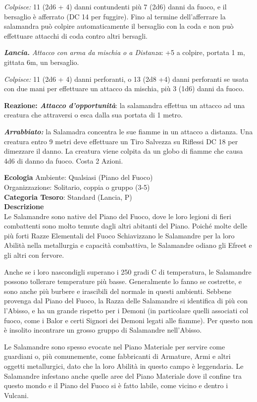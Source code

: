 \begin{multicols}{2}
{\emph{Colpisce:} 11 (2d6 + 4) danni contundenti più 7 (2d6) danni da fuoco, e il bersaglio è afferrato (DC 14 per fuggire). Fino al termine dell'afferrare la salamandra può colpire automaticamente il bersaglio con la coda e non può effettuare attacchi di coda contro altri bersagli.

\emph{\textbf{Lancia.} Attacco con arma da mischia o a Distanza}: +5 a colpire, portata 1 m, gittata 6m, un bersaglio.

\emph{Colpisce:} 11 (2d6 + 4) danni perforanti, o 13 (2d8 +4) danni perforanti se usata con due mani per effettuare un attacco da mischia, più 3 (1d6) danni da fuoco.

\textbf{Reazione: \emph{Attacco d'opportunità}}: la salamandra effettua un attacco ad una creatura che attraversi o esca dalla sua portata di 1 metro.

\emph{\textbf{Arrabbiato:}} la Salamadra concentra le sue fiamme in un attacco a distanza. Una creatura entro 9 metri deve effettuare un Tiro Salvezza su Riflessi DC 18 per dimezzare il danno. La creatura viene colpita da un globo di fiamme che causa 4d6 di danno da fuoco. Costa 2 Azioni.

\textbf{Ecologia}
Ambiente: Qualsiasi (Piano del Fuoco)\\
Organizzazione: Solitario, coppia o gruppo (3-5)\\
\textbf{Categoria Tesoro}: Standard (Lancia, P)\\
\textbf{Descrizione}\\
Le Salamandre sono native del Piano del Fuoco, dove le loro legioni di fieri combattenti sono molto temute dagli altri abitanti del Piano. Poiché molte delle più forti Razze Elementali del Fuoco Schiavizzano le Salamandre per la loro Abilità nella metallurgia e capacità combattiva, le Salamandre odiano gli Efreet e gli altri con fervore.

Anche se i loro nascondigli superano i 250 gradi C di temperatura, le Salamandre possono tollerare temperature più basse. Generalmente lo fanno se costrette, e sono anche più burbere e irascibili del normale in questi ambienti. Sebbene provenga dal Piano del Fuoco, la Razza delle Salamandre si identifica di più con l'Abisso, e ha un grande rispetto per i Demoni (in particolare quelli associati col fuoco, come i Balor e certi Signori dei Demoni legati alle fiamme). Per questo non è insolito incontrare un grosso gruppo di Salamandre nell'Abisso.

Le Salamandre sono spesso evocate nel Piano Materiale per servire come guardiani o, più comunemente, come fabbricanti di Armature, Armi e altri oggetti metallurgici, dato che la loro Abilità in questo campo è leggendaria. Le Salamandre infestano anche quelle aree del Piano Materiale dove il confine tra questo mondo e il Piano del Fuoco si è fatto labile, come vicino e dentro i Vulcani.

}
\end{multicols}
